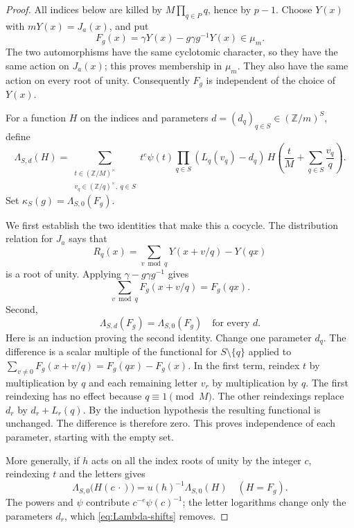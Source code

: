 \documentclass[11pt,a4paper]{article}
\theoremstyle{definition}
\newcommand{\Z}{\mathbb Z}
\begin{document}
\begin{proof}
All indices below are killed by
\(M\prod_{q\in P}q\), hence by \(p-1\).
Choose \(Y(x)\) with \(mY(x)=J_a(x)\), and put
\[
 F_g(x)=\gamma Y(x)-g\gamma g^{-1}Y(x)\in\mu_m.
\]
The two automorphisms have the same cyclotomic character, so
they have the same action on \(J_a(x)\); this proves membership in \(\mu_m\).
They also have the same action on every root of unity.
Consequently \(F_g\) is independent of the choice of \(Y(x)\).

For a function \(H\) on the indices and parameters
\(d=(d_q)_{q\in S}\in(\Z/m)^S\), define
\[
 \Lambda_{S,d}(H)=
 \sum_{\substack{t\in(\Z/M)^\times\\
                  v_q\in(\Z/q)^\times,\ q\in S}}
 t^e\psi(t)\prod_{q\in S}(L_q(v_q)-d_q)\,
 H\left(\frac tM+\sum_{q\in S}\frac{v_q}{q}\right).
\]
Set \(\kappa_S(g)=\Lambda_{S,0}(F_g)\).

We first establish the two identities that make this a cocycle.
The distribution relation for \(J_a\) says that
\[
 R_q(x)=\sum_{v\bmod q}Y(x+v/q)-Y(qx)
\]
is a root of unity. Applying \(\gamma-g\gamma g^{-1}\) gives
\begin{equation}\label{eq:F-distribution}
 \sum_{v\bmod q}F_g(x+v/q)=F_g(qx).
\end{equation}
Second,
\begin{equation}\label{eq:Lambda-shifts}
 \Lambda_{S,d}(F_g)=\Lambda_{S,0}(F_g)
                 \quad\text{for every }d.
\end{equation}
Here is an induction proving the second identity.
Change one parameter \(d_q\).
The difference is a scalar multiple of the functional for
\(S\setminus\{q\}\) applied to
\(\sum_{v\ne0}F_g(x+v/q)=F_g(qx)-F_g(x)\).
In the first term, reindex \(t\) by multiplication by \(q\)
and each remaining letter \(v_r\) by multiplication by \(q\).
The first reindexing has no effect because \(q\equiv1\pmod M\).
The other reindexings replace \(d_r\) by
\(d_r+L_r(q)\). By the induction hypothesis the resulting
functional is unchanged. The difference is therefore zero.
This proves independence of each parameter, starting with the empty set.

More generally, if \(h\) acts on all the index roots of unity
by the integer \(c\), reindexing \(t\) and the letters gives
\begin{equation}\label{eq:Lambda-covariance}
 \Lambda_{S,0}\bigl(H(c\,\cdot)\bigr)
            =u(h)^{-1}\Lambda_{S,0}(H)
                      \quad(H=F_g).
\end{equation}
The powers and \(\psi\) contribute \(c^{-e}\psi(c)^{-1}\);
the letter logarithms change only the parameters \(d_r\),
which \eqref{eq:Lambda-shifts} removes.


\end{proof}
\end{document}
